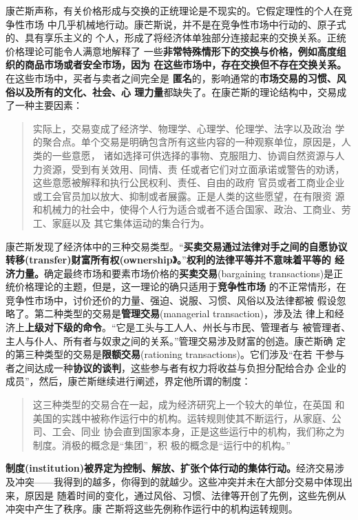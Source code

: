 康芒斯声称，有关价格形成与交换的正统理论是不现实的。它假定理性的个人在竞争性市场
中几乎机械地行动。康芒斯说，并不是在竞争性市场中行动的、原子式的、具有享乐主义的
个人，形成了将经济体单独部分连接起来的交换关系。正统价格理论可能令人满意地解释了
一些\textbf{非常特殊情形下的交换与价格，例如高度组织的商品市场或者安全市场，因为
在这些市场中，存在交换但不存在交换关系。}在这些市场中，买者与卖者之间完全是
\textbf{匿名}的，影响通常的\textbf{市场交易的习惯、风俗以及所有的文化、社会、心
理力量}都缺失了。在康芒斯的理论结构中，交易成了一种主要因素：

\begin{quotation}实际上，交易变成了经济学、物理学、心理学、伦理学、法字以及政治
学的聚合点。单个交易是明确包含所有这些内容的一种观察单位，原因是，人类的一些意愿，
诸如选择可供选择的事物、克服阻力、协调自然资源与人力资源，受到有关效用、同情、责
任或者它们对立面承诺或警告的劝诱，这些意愿被解释和执行公民权利、责任、自由的政府
官员或者工商业企业或工会官员加以放大、抑制或者展露。正是人类的这些愿望，在有限资
源和机械力的社会中，使得个人行为适合或者不适合国家、政治、工商业、劳工、家庭以及
其它集体运动的集合行为。
\end{quotation}

康芒斯发现了经济体中的三种交易类型。“\textbf{买卖交易通过法律对手之间的自愿协议
转移(transfer)财富所有权(ownership》。}”\textbf{权利的法律平等并不意味着平等的
经济力量。}确定最终市场和要素市场价格的\textbf{买卖交易}(bargaining
transactions)是正统价格理论的主题，但是，这一理论的确只适用于\textbf{竞争性市场}
的不正常情形，在竞争性市场中，讨价还价的力量、强迫、说服、习惯、风俗以及法律都被
假设忽略了。第二种类型的交易是\textbf{管理交易}(managerial transaction)，涉及法
律上和经济上\textbf{上级对下级的命令}。“它是工头与工人人、州长与市民、管理者与
被管理者、主人与仆人、所有者与奴隶之间的关系。”管理交易涉及财富的创造。康芒斯确
定的第三种类型的交易是\textbf{限额交易}(rationing transactions)。它们涉及“在若
干参与者之间达成一种\textbf{协议的谈判}，这些参与者有权力将收益与负担分配给合办
企业的成员”，然后，康芒斯继续进行阐述，界定他所谓的制度：

\begin{quotation}这三种类型的交易合在一起，成为经济研究上一个较大的单位，在英国
和美国的实践中被称作运行中的机构。运转规则使其不断运行，从家庭、公司、工会、同业
协会直到国家本身，正是这些运行中的机构，我们称之为制度。消极的概念是“集团”，积
极的概念是“运行中的机构。”
\end{quotation}

\textbf{制度(institution)被界定为控制、解放、扩张个体行动的集体行动。}经济交易涉
及冲突——我得到的越多，你得到的就越少。这些冲突并未在大部分交易中体现出来，原因是
随着时间的变化，通过风俗、习惯、法律等开创了先例，这些先例从冲突中产生了秩序。康
芒斯将这些先例称作运行中的机构运转规则。

